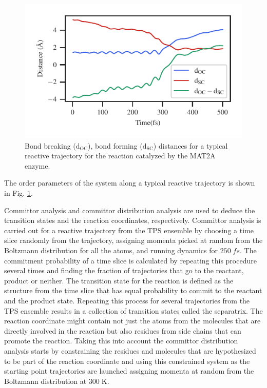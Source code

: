 \documentclass[journal=jpcbfk,manuscript=article,layout=traditional]{achemso}
\begin{document}
\begin{figure}
\includegraphics[scale=1.0]{figures/mat2a-diff167.pdf}
\caption{Bond breaking ($\mathrm{d}_{\mathrm{OC}}$), bond forming 
($\mathrm{d}_{\mathrm{SC}}$) distances for a typical 
reactive trajectory for the reaction catalyzed by the MAT2A enzyme.}
\label{fig:mat2a-reactive-traj}
\end{figure}
The order parameters of the system along a typical reactive trajectory is 
shown in Fig. \ref{fig:mat2a-reactive-traj}.

Committor analysis and committor distribution analysis are used to deduce 
the transition states and the reaction coordinates, respectively. 
Committor analysis is carried out for a reactive trajectory 
from the TPS ensemble by choosing a time slice randomly from the trajectory, assigning
momenta picked at random from the Boltzmann distribution for all the atoms, and running 
dynamics for $250\;fs$. The commitment probability of a time slice is calculated by 
repeating this procedure several times and finding the fraction of trajectories that go 
to the reactant, product or neither. The transition state for the reaction is defined as 
the structure from the time slice that has equal probability to commit to the reactant 
and the product state. Repeating this process for several trajectories from the TPS
ensemble results in a collection of transition states called the separatrix. 
The reaction coordinate might contain not just the atoms from the molecules that 
are directly involved in the reaction but also residues from side chains that can 
promote the reaction. Taking this into account the committor distribution analysis
starts by constraining the residues and molecules that are hypothesized to be part of the 
reaction coordinate and using this constrained system as the starting point 
trajectories are launched assigning momenta at random from the Boltzmann distribution at 
$300\;\text{K}$.     
\end{document}
